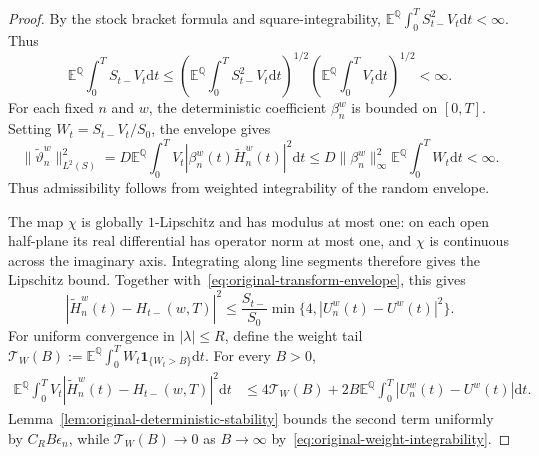 \documentclass[10pt,a4paper]{amsart}
\newcommand{\E}{\mathbb{E}}
\newcommand{\Q}{\mathbb{Q}}
\newcommand{\dd}{\mathrm{d}}
\begin{document}
\begin{proof}
By the stock bracket formula and square-integrability,
$\E^\Q\int_0^T S_{t-}^2V_t\dd t<\infty$. Thus
\begin{equation}
\label{eq:original-weight-integrability}
 \E^\Q\int_0^T S_{t-}V_t\dd t
 \leq\left(\E^\Q\int_0^T S_{t-}^2V_t\dd t\right)^{1/2}
      \left(\E^\Q\int_0^T V_t\dd t\right)^{1/2}<\infty.
\end{equation}
For each fixed $n$ and $w$, the deterministic coefficient $\beta_n^w$ is
bounded on $[0,T]$. Setting $W_t=S_{t-}V_t/S_0$, the envelope gives
\[
 \|\widetilde\vartheta_n^w\|_{L^2(S)}^2
 =D\E^\Q\int_0^T V_t|\beta_n^w(t)\widetilde H_n^w(t)|^2\dd t
 \leq D\|\beta_n^w\|_\infty^2\E^\Q\int_0^T W_t\dd t<\infty.
\]
Thus admissibility follows from weighted integrability of the random
envelope.

The map $\chi$ is globally $1$-Lipschitz and has modulus at most one:
on each open half-plane its real differential has operator norm at most
one, and $\chi$ is continuous across the imaginary axis. Integrating along
line segments therefore gives the Lipschitz bound.
Together with~\eqref{eq:original-transform-envelope}, this gives
\[
 |\widetilde H_n^w(t)-H_{t-}(w,T)|^2
 \leq\frac{S_{t-}}{S_0}
        \min\{4,|U_n^w(t)-U^w(t)|^2\}.
\]
For uniform convergence in $|\lambda|\leq R$, define the weight tail
$\mathcal T_W(B):=\E^\Q\int_0^T W_t\mathbf1_{\{W_t>B\}}\dd t$.
For every $B>0$,
\begin{align*}
 \E^\Q\int_0^T V_t|\widetilde H_n^w(t)-H_{t-}(w,T)|^2\dd t
 &\leq 4\mathcal T_W(B)
       +2B\E^\Q\int_0^T|U_n^w(t)-U^w(t)|\dd t.
\end{align*}
Lemma~\ref{lem:original-deterministic-stability} bounds the second term
uniformly by $C_R B\epsilon_n$, while
$\mathcal T_W(B)\to0$ as $B\to\infty$ by~\eqref{eq:original-weight-integrability}.


\end{proof}
\end{document}
